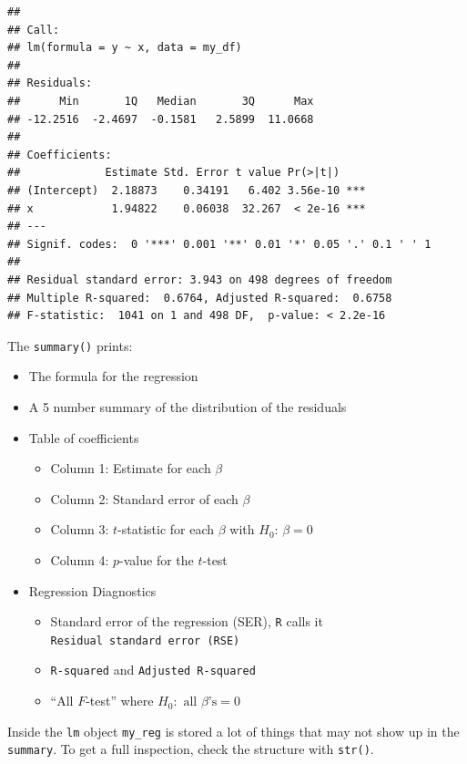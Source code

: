 \documentclass[]{book}
\providecommand{\tightlist}{%
  \setlength{\itemsep}{0pt}\setlength{\parskip}{0pt}}
\theoremstyle{definition}
\theoremstyle{definition}
\theoremstyle{definition}
\theoremstyle{remark}
\begin{document}
\begin{verbatim}
## 
## Call:
## lm(formula = y ~ x, data = my_df)
## 
## Residuals:
##      Min       1Q   Median       3Q      Max 
## -12.2516  -2.4697  -0.1581   2.5899  11.0668 
## 
## Coefficients:
##             Estimate Std. Error t value Pr(>|t|)    
## (Intercept)  2.18873    0.34191   6.402 3.56e-10 ***
## x            1.94822    0.06038  32.267  < 2e-16 ***
## ---
## Signif. codes:  0 '***' 0.001 '**' 0.01 '*' 0.05 '.' 0.1 ' ' 1
## 
## Residual standard error: 3.943 on 498 degrees of freedom
## Multiple R-squared:  0.6764, Adjusted R-squared:  0.6758 
## F-statistic:  1041 on 1 and 498 DF,  p-value: < 2.2e-16
\end{verbatim}

The \texttt{summary()} prints:

\begin{itemize}
\tightlist
\item
  The formula for the regression
\item
  A 5 number summary of the distribution of the residuals
\item
  Table of coefficients

  \begin{itemize}
  \tightlist
  \item
    Column 1: Estimate for each \(\beta\)
  \item
    Column 2: Standard error of each \(\beta\)
  \item
    Column 3: \(t\)-statistic for each \(\beta\) with
    \(H_0: \, \beta=0\)
  \item
    Column 4: \(p\)-value for the \(t\)-test
  \end{itemize}
\item
  Regression Diagnostics

  \begin{itemize}
  \tightlist
  \item
    Standard error of the regression (SER), \texttt{R} calls it
    \texttt{Residual\ standard\ error\ (RSE)}
  \item
    \texttt{R-squared} and \texttt{Adjusted\ R-squared}
  \item
    ``All \(F\)-test'' where \(H_0: \text{ all } \beta\text{'s}=0\)
  \end{itemize}
\end{itemize}

Inside the \texttt{lm} object \texttt{my\_reg} is stored a lot of things
that may not show up in the \texttt{summary}. To get a full inspection,
check the structure with \texttt{str()}.
\end{document}
